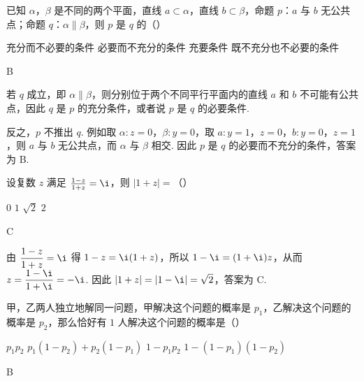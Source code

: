 \begin{problem}
已知 \(\alpha\)，\(\beta\) 是不同的两个平面，直线 \(a \subset \alpha\)，直线 \(b \subset \beta\)，命题 \(p\)：\(a\) 与 \(b\) 无公共点；命题 \(q\)：\(\alpha \parallel \beta\)，则 \(p\) 是 \(q\) 的（\quad）

\choices
    {充分而不必要的条件}
    {必要而不充分的条件}
    {充要条件}
    {既不充分也不必要的条件}
\end{problem}

\begin{answer}B\end{answer}

\begin{solution}
若 \(q\) 成立，即 \(\alpha\parallel\beta\)，则分别位于两个不同平行平面内的直线 \(a\) 和 \(b\) 不可能有公共点，因此 \(q\) 是 \(p\) 的充分条件，或者说 \(p\) 是 \(q\) 的必要条件.

反之，\(p\) 不推出 \(q\). 例如取 \(\alpha\colon z=0\)，\(\beta\colon y=0\)，取 \(a\colon y=1\)，\(z=0\)，\(b\colon y=0\)，\(z=1\)，则 \(a\) 与 \(b\) 无公共点，而 \(\alpha\) 与 \(\beta\) 相交. 因此 \(p\) 是 \(q\) 的必要而不充分的条件，答案为 B.
\end{solution}

\begin{problem}
设复数 \(z\) 满足 \(\frac{1 - z}{1 + z} = \i\)，则 \(|1 + z| =\)（\quad）

\choices
    {\(0\)}
    {\(1\)}
    {\(\sqrt{2}\)}
    {\(2\)}
\end{problem}

\begin{answer}C\end{answer}

\begin{solution}
由 \(\dfrac{1-z}{1+z}=\i\) 得 \(1-z=\i(1+z)\)，所以
\(1-\i=(1+\i)z\)，从而
\(z=\dfrac{1-\i}{1+\i}=-\i\). 因此
\(\lvert1+z\rvert=\lvert1-\i\rvert=\sqrt{2}\)，答案为 C.
\end{solution}

\begin{problem}
甲，乙两人独立地解同一问题，甲解决这个问题的概率是 \(p_{1}\)，乙解决这个问题的概率是 \(p_{2}\)，那么恰好有 \(1\) 人解决这个问题的概率是（\quad）

\choices
    {\(p_{1}p_{2}\)}
    {\(p_1(1 - p_2) + p_2(1 - p_1)\)}
    {\(1 - p_{1}p_{2}\)}
    {\(1 - (1 - p_1)(1 - p_2)\)}
\end{problem}

\begin{answer}B\end{answer}


